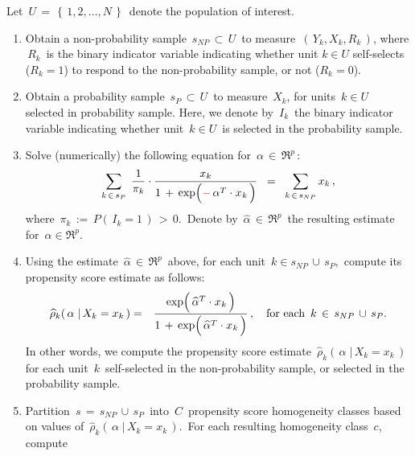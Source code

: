 Let \,$U \,=\, \left\{\,1,2,\ldots,N\,\right\}$\, denote the population of interest.
\begin{enumerate}
\item
	Obtain a non-probability sample \,$s_{NP}\,\subset\,U$\,
	to measure \,$(\,Y_{k},X_{k},R_{k}\,)$,
	where \,$R_{k}$\, is the binary indicator variable indicating whether
	unit $k \in U$ self-selects ($R_{k} = 1$) to respond to the non-probability sample,
	or not ($R_{k} = 0$).
\item
	Obtain a probability sample \,$s_{P} \,\subset\, U$\,
	to measure \,$X_{k}$, for units \,$k \in U$\, selected in probability sample.
	Here, we denote by \,$I_{k}$\, the binary indicator variable indicating whether unit \,$k \in U$\, is selected
	in the probability sample. 
\item
	Solve (numerically) the following equation for \,$\alpha\,\in\,\Re^{p}$\,:
	\begin{equation*}
	\underset{k\,\in\,s_{P}}{\sum}\;\,
	\dfrac{1}{\pi_{k}}
	\cdot
	\dfrac{x_{k}}{1 \,+\, \exp\!\left({\color{red}-}\,\alpha^{T} \cdot \overset{{\color{white}-}}{x}_{k}\,\right)}
	\;\; = \;\;
		\underset{k\,\in\,s_{NP}}{\sum}\, x_{k}\,,
	\end{equation*}
	where \,$\pi_{k} \,:=\, P(\,I_{k} = 1\,) \,>\, 0$.\,
	Denote by \,$\widehat{\alpha} \,\in\, \Re^{p}$\, the resulting estimate for \,$\alpha \in \Re^{p}$.
\item
	Using the estimate \,$\widehat{\alpha} \,\in\, \Re^{p}$\, above,
	for each unit \,$k \in s_{NP}\,\cup\,s_{P}$,\, compute its propensity score estimate as follows:
	\begin{eqnarray*}
	\widehat{\rho}_{k}\!\left(\,\alpha\;\vert\,X_{k}=x_{k}\,\right)
	& = &
		\dfrac{
			\exp\!\left(\,\widehat{\alpha}^{T} \cdot \overset{{\color{white}-}}{x}_{k} \,\right)
			}{
			1 \,+\, \exp\!\left(\,\widehat{\alpha}^{T} \cdot \overset{{\color{white}-}}{x}_{k} \,\right)
			}\,,
	\quad
	\textnormal{for each \,$k \,\in\, s_{NP} \,\cup\, s_{P}$}.
	\end{eqnarray*}
	In other words, we compute the propensity score estimate
	\,$\widehat{\rho}_{k}(\,\alpha\;\vert\,X_{k} = x_{k}\,)$\,
	for each unit \,$k$\, self-selected in the non-probability sample, or selected in the probability sample.
\item
	Partition \,$s \,=\, s_{NP} \,\cup\, s_{P}$\, into \,$C$\, propensity score homogeneity classes
	based on values of \,$\widehat{\rho}_{k}\!\left(\,\alpha\;\vert\,X_{k}=x_{k}\,\right)$.\,
	For each resulting homogeneity class \,$c$,\, compute

\end{enumerate}

